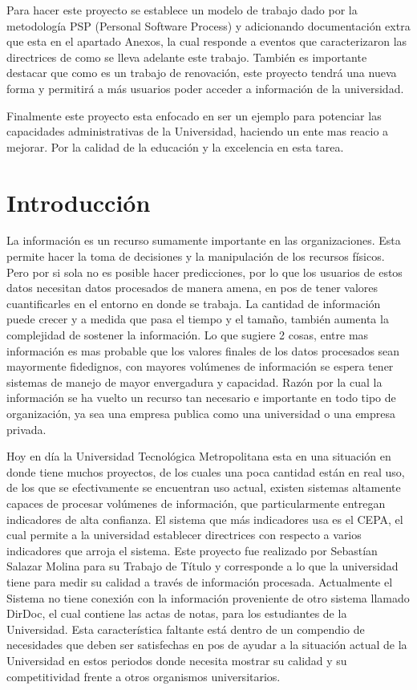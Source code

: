 \documentclass[a4paper,12pt,openany,oneside]{book}
\begin{document}
Para hacer este proyecto se establece un modelo de trabajo dado por la metodología PSP (Personal Software Process) y adicionando documentación extra que esta en el apartado Anexos, la cual responde a eventos que caracterizaron las directrices de como se lleva adelante este trabajo. También es importante destacar que como es un trabajo de renovación, este proyecto tendrá una nueva forma y permitirá a más usuarios poder acceder a información de la universidad.

Finalmente este proyecto esta enfocado en ser un ejemplo para potenciar las capacidades administrativas de la Universidad, haciendo un ente mas reacio a mejorar. Por la calidad de la educación y la excelencia en esta tarea.
\tableofcontents
\listoffigures
\chapter*{Introducción}
\thispagestyle{empty}
La información es un recurso sumamente importante en las organizaciones. Esta permite hacer la toma de decisiones y la manipulación de los recursos físicos. Pero por si sola no es posible hacer predicciones, por lo que los usuarios de estos datos necesitan datos procesados de manera amena, en pos de tener valores cuantificarles en el entorno en donde se trabaja. La cantidad de información puede crecer y a medida que pasa el tiempo y el tamaño, también aumenta la complejidad de sostener la información. Lo que sugiere 2 cosas, entre mas información es mas probable que los valores finales de los datos procesados sean mayormente fidedignos, con mayores volúmenes de información se espera tener sistemas de manejo de mayor envergadura y capacidad. Razón por la cual la información se ha vuelto un recurso tan necesario e importante en todo tipo de organización, ya sea una empresa publica como una universidad o una empresa privada.

Hoy en día la Universidad Tecnológica Metropolitana esta en una situación en donde tiene muchos proyectos, de los cuales una poca cantidad están en real uso, de los que se efectivamente se encuentran uso actual, existen sistemas altamente capaces de procesar volúmenes de información, que particularmente entregan indicadores de alta confianza. El sistema que más indicadores usa es el CEPA, el cual permite a la universidad establecer directrices con respecto a varios indicadores que arroja el sistema. Este proyecto fue realizado por Sebastían Salazar Molina para su Trabajo de Título y corresponde a lo que la universidad tiene para medir su calidad a través de información procesada. Actualmente el Sistema no tiene conexión con la información proveniente de otro sistema llamado DirDoc, el cual contiene las actas de notas, para los estudiantes de la Universidad. Esta característica faltante está dentro de un compendio de necesidades que deben ser satisfechas en pos de ayudar a la situación actual de la Universidad en estos periodos donde necesita mostrar su calidad y su competitividad frente a otros organismos universitarios.
\end{document}

